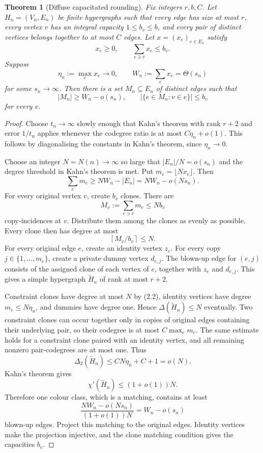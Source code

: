 \documentclass[11pt]{article}
\newtheorem{theorem}{Theorem}[section]
\begin{document}
\begin{theorem}[Diffuse capacitated rounding]\label{thm:round}
Fix integers $r,b,C$. Let $H_n=(V_n,E_n)$ be finite hypergraphs such that every edge has size at most $r$, every vertex $v$ has an integral capacity $1\le b_v\le b$, and every pair of distinct vertices belongs together to at most $C$ edges. Let $x=(x_e)_{e\in E_n}$ satisfy
\[
x_e\ge0,
\qquad
\sum_{e\ni v}x_e\le b_v.
\]
Suppose
\[
\eta_n:=\max_e x_e\to0,
\qquad
W_n:=\sum_e x_e=\Theta(s_n)
\]
for some $s_n\to\infty$. Then there is a set $M_n\subseteq E_n$ of distinct edges such that
\[
|M_n|\ge W_n-o(s_n),
\qquad
|\{e\in M_n:v\in e\}|\le b_v
\]
for every $v$.
\end{theorem}

\begin{proof}
Choose $t_n\to\infty$ slowly enough that Kahn's theorem with rank $r+2$ and error $1/t_n$ applies whenever the codegree ratio is at most $C\eta_n+o(1)$. This follows by diagonalising the constants in Kahn's theorem, since $\eta_n\to0$.

Choose an integer $N=N(n)\to\infty$ so large that $|E_n|/N=o(s_n)$ and the degree threshold in Kahn's theorem is met. Put $m_e=\lfloor Nx_e\rfloor$. Then
\[
\sum_e m_e\ge NW_n-|E_n|=NW_n-o(Ns_n).
\tag{2.1}
\]
For every original vertex $v$, create $b_v$ clones. There are
\[
M_v:=\sum_{e\ni v}m_e\le Nb_v
\]
copy-incidences at $v$. Distribute them among the clones as evenly as possible. Every clone then has degree at most
\[
\left\lceil M_v/b_v\right\rceil\le N.
\tag{2.2}
\]
For every original edge $e$, create an identity vertex $z_e$. For every copy $j\in\{1,\dots,m_e\}$, create a private dummy vertex $d_{e,j}$. The blown-up edge for $(e,j)$ consists of the assigned clone of each vertex of $e$, together with $z_e$ and $d_{e,j}$. This gives a simple hypergraph $\widetilde H_n$ of rank at most $r+2$.

Constraint clones have degree at most $N$ by (2.2), identity vertices have degree $m_e\le N\eta_n$, and dummies have degree one. Hence $\Delta(\widetilde H_n)\le N$ eventually. Two constraint clones can occur together only in copies of original edges containing their underlying pair, so their codegree is at most $C\max_e m_e$. The same estimate holds for a constraint clone paired with an identity vertex, and all remaining nonzero pair-codegrees are at most one. Thus
\[
\Delta_2(\widetilde H_n)\le CN\eta_n+C+1=o(N).
\tag{2.3}
\]
Kahn's theorem gives
\[
\chi'(\widetilde H_n)\le(1+o(1))N.
\]
Therefore one colour class, which is a matching, contains at least
\[
\frac{NW_n-o(Ns_n)}{(1+o(1))N}=W_n-o(s_n)
\]
blown-up edges. Project this matching to the original edges. Identity vertices make the projection injective, and the clone matching condition gives the capacities $b_v$.\qedhere
\end{proof}
\end{document}
